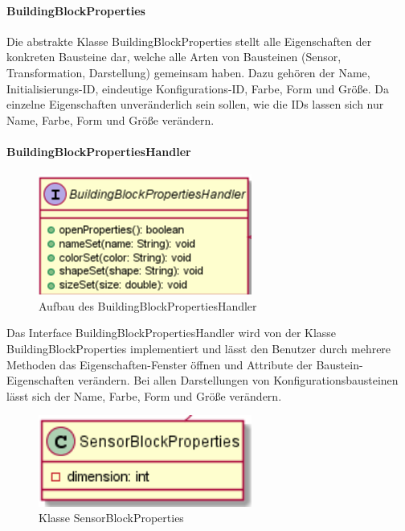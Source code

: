 \documentclass[parskip=full]{scrartcl}
\begin{document}
\paragraph{BuildingBlockProperties}

Die abstrakte Klasse BuildingBlockProperties stellt alle Eigenschaften der konkreten Bausteine dar, welche alle Arten von Bausteinen (Sensor, Transformation, Darstellung) gemeinsam haben. Dazu gehören der Name,  Initialisierungs-ID, eindeutige Konfigurations-ID, Farbe, Form und Größe. Da einzelne Eigenschaften unveränderlich sein sollen, wie die IDs lassen sich nur Name, Farbe, Form und Größe verändern.

\paragraph{BuildingBlockPropertiesHandler}

\begin{figure}[htbp]
	\begin{center}
		\includegraphics[width = 7cm]{Grafiken/View/BuildingBlockPropertiesHandler.png}
		\caption{Aufbau des BuildingBlockPropertiesHandler}
		\label{Entwurf_Grob}
	\end{center}
\end{figure}

Das Interface BuildingBlockPropertiesHandler wird von der Klasse BuildingBlockProperties implementiert und lässt den Benutzer durch mehrere Methoden das Eigenschaften-Fenster öffnen und Attribute der Baustein-Eigenschaften verändern. Bei allen Darstellungen von Konfigurationsbausteinen lässt sich der Name, Farbe, Form und Größe verändern.

\begin{figure}[htbp]
	\begin{center}
		\includegraphics[width = 7cm]{Grafiken/View/SensorBlockProperties.png}
		\caption{Klasse SensorBlockProperties}
		\label{SensorBlockProperties}
	\end{center}
\end{figure}
\end{document}
